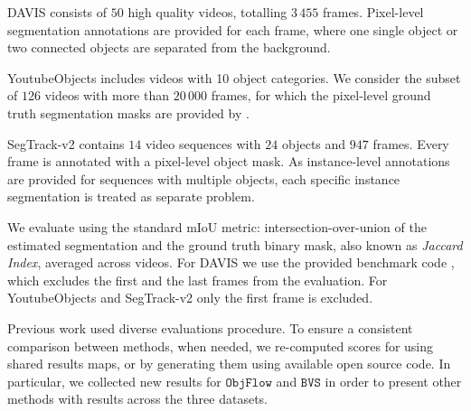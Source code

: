 \documentclass[10pt,twocolumn,letterpaper]{article}
\makeatletter
\renewcommand{\paragraph}{\@startsection{paragraph}{4}{\z@}{0.5ex \@plus 1ex \@minus .2ex}{-0.5em}{\normalfont \normalsize \bfseries}}
\newcommand{\segtrack}{SegTrack-v2}
\makeatother
\begin{document}
DAVIS \cite{Perazzi2016Cvpr} consists of $50$ high quality videos, totalling $3\,455$ frames. Pixel-level segmentation annotations are provided for each frame, where one single object or two connected objects are
separated from the background.

YoutubeObjects \cite{Prest2012Cvpr} includes videos with 10 object categories. We consider the subset of $126$ videos with more than $20\,000$ frames, for which the pixel-level ground truth segmentation masks are provided
by \cite{Jain2014Eccv}.

\segtrack{} \cite{Li2013Iccv} contains $14$ video sequences with $24$ objects and $947$ frames. Every frame is annotated with a pixel-level object mask.
As instance-level annotations are provided for sequences with multiple objects, each specific instance segmentation is treated as separate problem.

\paragraph{Evaluation}
We evaluate using the standard mIoU metric: intersection-over-union of the estimated segmentation and the ground truth binary mask, also known as \emph{Jaccard Index}, averaged across videos.
For DAVIS we use the provided benchmark code \cite{Perazzi2016Cvpr}, which excludes the first and the last frames from the evaluation. For YoutubeObjects and \segtrack{} only the first frame is excluded.

Previous work used diverse evaluations procedure. To ensure a consistent comparison between methods, when needed, we re-computed scores for using shared results maps, or by generating them using available open source code.
In particular, we collected new results for $\mathtt{ObjFlow}$ \cite{Tsai2016Cvpr} and $\mathtt{BVS}$ \cite{Maerki2016Cvpr} in order to present other methods with results across the three datasets.
\end{document}
